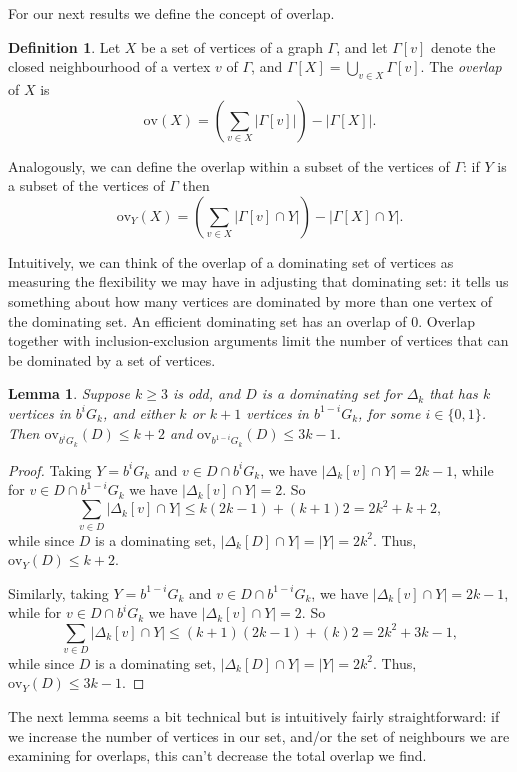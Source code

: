 \documentclass{amsart}
\newtheorem{lem}[thm]{Lemma}
\theoremstyle{remark}
\theoremstyle{definition}
\newtheorem{defn}[thm]{Definition}
\newcommand{\ov}{\mathrm{ov}}
\begin{document}
For our next results we define the concept of overlap. 

\begin{defn}
    Let $X$ be a set of vertices of a graph $\Gamma$, and let $\Gamma[v]$ denote the closed neighbourhood of a vertex $v$ of $\Gamma$, and $\Gamma[X]=\bigcup_{v \in X}\Gamma[v]$. The \emph{overlap} of $X$ is $$\ov(X)=\left(\sum_{v \in X}|\Gamma[v]|\right)-|\Gamma[X]|.$$

    Analogously, we can define the overlap within a subset of the vertices of $\Gamma$: if $Y$ is a subset of the vertices of $\Gamma$ then $$\ov_Y(X)=\left(\sum_{v \in X}|\Gamma[v] \cap Y|\right)-|\Gamma[X]\cap Y|.$$
\end{defn}

Intuitively, we can think of the overlap of a dominating set of vertices as measuring the flexibility we may have in adjusting that dominating set: it tells us something about how many vertices are dominated by more than one vertex of the dominating set. An efficient dominating set has an overlap of $0$. Overlap together with inclusion-exclusion arguments limit the number of vertices that can be dominated by a set of vertices.

\begin{lem}\label{overlap-Gk}
    Suppose $k \ge 3$ is odd, and $D$ is a dominating set for $\Delta_k$ that has $k$ vertices in $b^iG_k$, and either $k$ or $k+1$ vertices in $b^{1-i}G_k$, for some $i \in \{0,1\}$. Then $\ov_{b^iG_k}(D) \le k+2$ and $\ov_{b^{1-i}G_k}(D) \le 3k-1$.
\end{lem}

\begin{proof}
    Taking $Y=b^iG_k$ and $v \in D \cap b^iG_k$, we have $|\Delta_k[v] \cap Y|=2k-1$, while for $v \in D \cap b^{1-i}G_k$ we have $|\Delta_k[v]\cap Y|=2$. So $$\sum_{v \in D}|\Delta_k[v]\cap Y| \le k(2k-1)+(k+1)2=2k^2+k+2,$$ while since $D$ is a dominating set, $|\Delta_k[D] \cap Y| = |Y|=2k^2$. Thus, $\ov_Y(D) \le k+2$. 

     Similarly, taking $Y=b^{1-i}G_k$ and $v \in D \cap b^{1-i}G_k$, we have $|\Delta_k[v] \cap Y|=2k-1$, while for $v \in D \cap b^{i}G_k$ we have $|\Delta_k[v]\cap Y|=2$. So $$\sum_{v \in D}|\Delta_k[v]\cap Y| \le (k+1)(2k-1)+(k)2=2k^2+3k-1,$$ while since $D$ is a dominating set, $|\Delta_k[D] \cap Y| = |Y|=2k^2$. Thus, $\ov_Y(D) \le 3k-1$.
  \end{proof}

  The next lemma seems a bit technical but is intuitively fairly straightforward: if we increase the number of vertices in our set, and/or the set of neighbours we are examining for overlaps, this can't decrease the total overlap we find.
\end{document}
